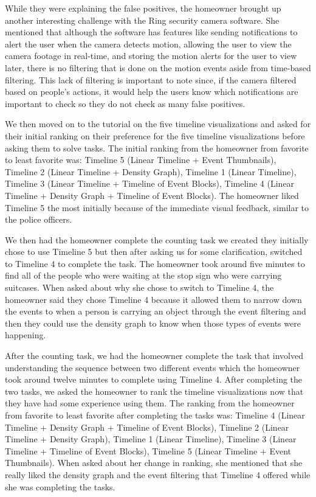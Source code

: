 \documentclass[doublespace,draft,nopageskip]{VTthesis} %
\begin{document}
While they were explaining the false positives, the homeowner brought up another interesting challenge with the Ring security camera software. She mentioned that although the software has features like sending notifications to alert the user when the camera detects motion, allowing the user to view the camera footage in real-time, and storing the motion alerts for the user to view later, there is no filtering that is done on the motion events aside from time-based filtering. This lack of filtering is important to note since, if the camera filtered based on people's actions, it would help the users know which notifications are important to check so they do not check as many false positives.

We then moved on to the tutorial on the five timeline visualizations and asked for their initial ranking on their preference for the five timeline visualizations before asking them to solve tasks. The initial ranking from the homeowner from favorite to least favorite was: Timeline 5 (Linear Timeline + Event Thumbnails), Timeline 2 (Linear Timeline + Density Graph), Timeline 1 (Linear Timeline), Timeline 3 (Linear Timeline + Timeline of Event Blocks), Timeline 4 (Linear Timeline + Density Graph + Timeline of Event Blocks). The homeowner liked Timeline 5 the most initially because of the immediate visual feedback, similar to the police officers. 

We then had the homeowner complete the counting task we created they initially chose to use Timeline 5 but then after asking us for some clarification, switched to Timeline 4 to complete the task. The homeowner took around five minutes to find all of the people who were waiting at the stop sign who were carrying suitcases. When asked about why she chose to switch to Timeline 4, the homeowner said they chose Timeline 4 because it allowed them to narrow down the events to when a person is carrying an object through the event filtering and then they could use the density graph to know when those types of events were happening.

After the counting task, we had the homeowner complete the task that involved understanding the sequence between two different events which the homeowner took around twelve minutes to complete using Timeline 4. After completing the two tasks, we asked the homeowner to rank the timeline visualizations now that they have had some experience using them. The ranking from the homeowner from favorite to least favorite after completing the tasks was: Timeline 4 (Linear Timeline + Density Graph + Timeline of Event Blocks), Timeline 2 (Linear Timeline + Density Graph), Timeline 1 (Linear Timeline), Timeline 3 (Linear Timeline + Timeline of Event Blocks), Timeline 5 (Linear Timeline + Event Thumbnails). When asked about her change in ranking, she mentioned that she really liked the density graph and the event filtering that Timeline 4 offered while she was completing the tasks. 
\end{document}

